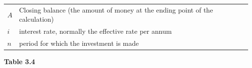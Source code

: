 \begin{itemize}[noitemsep]
{{\begin{center}
\begin{tabular}[t]{|l|l|}
    
        
                  \begin{math}A\end{math}
                 &
    
    
        Closing balance (the amount of money at the ending point of the calculation)%
     \tabularnewline\cline{1-1}\cline{2-2}
    
    
        
                  \begin{math}i\end{math}
                 &
    
    
        interest rate, normally the effective rate per annum%
     \tabularnewline\cline{1-1}\cline{2-2}
    
    
        
                  \begin{math}n\end{math}
                 &
    
    
        period for which the investment is made%
     \tabularnewline\cline{1-1}\cline{2-2}
    \end{tabular}
      \end{center}
    \begin{center}{\small\bfseries Table 3.4}\end{center}
    
}}
\end{itemize}
